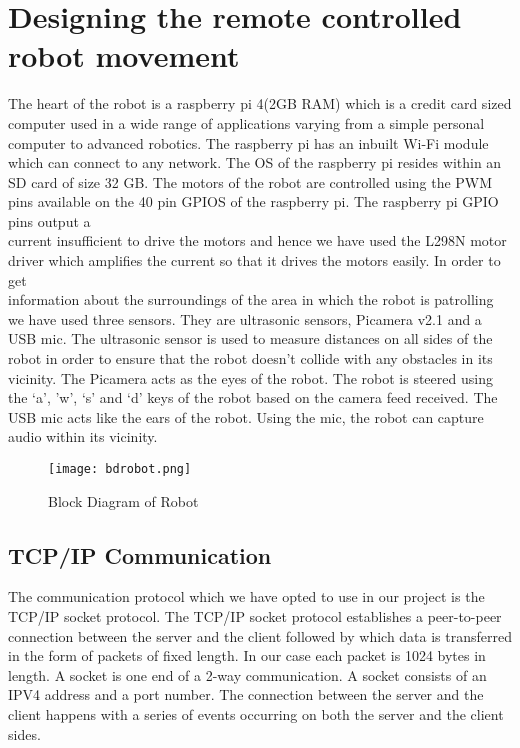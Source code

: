 \section{Designing the remote controlled robot movement}
The heart of the robot is a raspberry pi 4(2GB RAM) which is a credit card sized computer used in a wide range of applications varying from a simple personal \\computer to advanced robotics.  The raspberry pi has an inbuilt Wi-Fi module which can connect to any network. The OS of the raspberry pi resides within an SD card of size 32 GB. The motors of the robot are controlled using the PWM pins available on the 40 pin GPIOS of the raspberry pi. The raspberry pi GPIO pins output a \\current insufficient to drive the motors and hence we have used the L298N motor driver which amplifies the current so that it drives the motors easily. In order to get \\information about the surroundings of the area in which the robot is patrolling we have used three sensors. They are ultrasonic sensors, Picamera v2.1 and a USB mic. The ultrasonic sensor is used to measure distances on all sides of the robot in order to ensure that the robot doesn’t collide with any obstacles in its vicinity. The Picamera acts as the eyes of the robot. The robot is steered using the ‘a’, ’w’, ‘s’ and ‘d’ keys of the robot based on the camera feed received. The USB mic acts like the ears of the robot. Using the mic, the robot can capture audio within its vicinity.
\begin{figure}[h]
\centering
\texttt{[image: bdrobot.png]}
\caption{Block Diagram of Robot}
\end{figure}
\subsection{TCP/IP Communication}
The communication protocol which we have opted to use in our project is the TCP/IP socket protocol.  The TCP/IP socket protocol establishes a peer-to-peer connection between the server and the client followed by which data is transferred in the form of packets of fixed length. In our case each packet is 1024 bytes in length. A socket is one end of a 2-way communication. A socket consists of an IPV4 address and a port number. The connection between the server and the client happens with a series of events occurring on both the server and the client sides.
